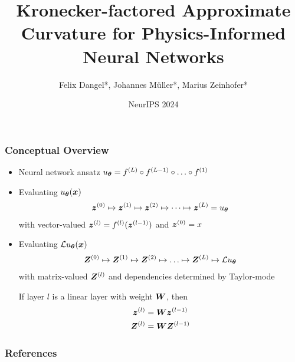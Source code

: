 \documentclass[12pt,usepdftitle=false,aspectratio=169]{beamer}
\title{%
  Kronecker-factored Approximate Curvature for Physics-Informed Neural Networks
}
\author{Felix Dangel*, Johannes M\"uller*, Marius Zeinhofer*}
\date{NeurIPS 2024}
\begin{document}
\makeTitleSlide



\begin{frame}
  \frametitle{Conceptual Overview}
  \begin{itemize}
  \item Neural network ansatz $u_{{\bm{\theta}}} = f^{(L)} \circ f^{(L-1)} \circ
    \ldots \circ f^{(1)}$
  \item Evaluating $u_{{\bm{\theta}}}({\bm{x}})$
    \begin{align*}
      {\bm{z}}^{(0)} \mapsto {\bm{z}}^{(1)}\mapsto {\bm{z}}^{(2)} \mapsto \dots \mapsto {\bm{z}}^{(L)} = u_{{\bm{\theta}}}
    \end{align*}
    with vector-valued ${\bm{z}}^{(l)} = f^{(l)}({\bm{z}}^{(l-1)})$ and ${\bm{z}}^{(0)} = x$

  \item Evaluating ${\mathcal{L}} u_{{\bm{\theta}}}({\bm{x}})$
    \begin{align*}
      {\bm{Z}}^{(0)} \mapsto {\bm{Z}}^{(1)} \mapsto {\bm{Z}}^{(2)} \mapsto \ldots \mapsto {\bm{Z}}^{(L)} \mapsto {\mathcal{L}} u_{{\bm{\theta}}}
    \end{align*}
    with matrix-valued ${\bm{Z}}^{(l)}$ and dependencies determined by Taylor-mode

    If layer $l$ is a linear layer with weight ${\bm{W}}$, then
    \begin{align*}
      {\bm{z}}^{(l)} &= {\bm{W}} {\bm{z}}^{(l-1)}
      \\
      {\bm{Z}}^{(l)} &= {\bm{W}} {\bm{Z}}^{(l-1)}
    \end{align*}

  \end{itemize}

\end{frame}






\begin{frame}[allowframebreaks]
  \frametitle{References}

  {\footnotesize
    
    
  }
\end{frame}
\end{document}
